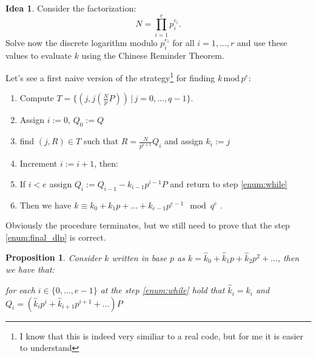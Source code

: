 \documentclass{article}
\theoremstyle{plain}
\newtheorem{prop}[teo]{Proposition}
\theoremstyle{remark}
\theoremstyle{definition}
\newtheorem{idea}{Idea}
\begin{document}
\begin{idea} \label{idea:ecdlp}
	Consider the factorization:
\begin{equation*}
	N = \prod_{i=1}^r p_i^{e_i}.
\end{equation*}
	Solve now the discrete logarithm modulo $p_i^{e_i}$ for all $i = 1,...,r$ and use these values to evaluate $k$ using the Chinese Reminder Theorem. 
\end{idea}

Let's see a first naive version of the strategy\footnote{I know that this is indeed very similiar to a real code, but for me it is easier to understand} for finding $k \,\text{mod}\, p^e$:
\begin{enumerate}
	\item Compute $T = \{ (j,j\left(\frac{N}{p}P\right)) \,|\, j = 0,...,q-1 \}$.
	\item Assign $i := 0$, $Q_0 := Q$
	\item \label{enum:while} find $(j,R)\in T$ such that $R = \frac{N}{p^{i+1}}Q_i$ and assign $k_i := j$
	\item Increment $i := i + 1$, then:
	\item \label{enum:if} If $i < e$ assign $Q_i := Q_{i-1} - k_{i-1} p^{i-1}P$ and return to step \ref{enum:while}
	\item Then we have $k \equiv k_0 + k_1p + ... + k_{e-1}p^{e-1} \mod q^e$ \label{enum:final_dlp}.
\end{enumerate}

Obviously the procedure terminates, but we still need to prove that the step \ref{enum:final_dlp} is correct.

\begin{prop}
	\label{prop:corr_dlp}
	Consider $k$ written in base $p$ as $k = \hat{k}_0 + \hat{k}_1p + \hat{k}_2p^2 + ...$, then we have that:

	for each $i \in \{0,...,e-1\}$ at the step \ref{enum:while} hold that 
	$\hat{k}_i = k_i$ and $Q_i = (\hat{k}_ip^i + \hat{k}_{i+1}p^{i+1} + ... )P$
\end{prop}
\end{document}
